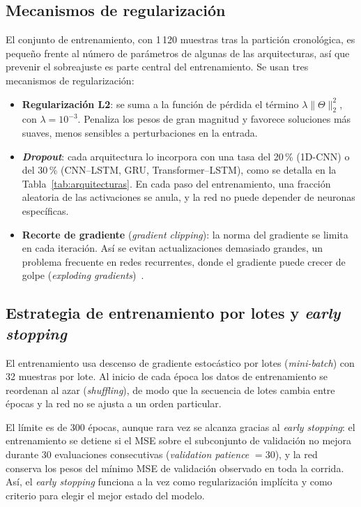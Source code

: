 \documentclass{report}
\begin{document}
\subsection{Mecanismos de regularización}
\label{subsec:regularizacion}

El conjunto de entrenamiento, con 1\,120 muestras tras la partición cronológica, es pequeño frente al número de parámetros de algunas de las arquitecturas, así que prevenir el sobreajuste es parte central del entrenamiento. Se usan tres mecanismos de regularización:

\begin{itemize}
    \item \textbf{Regularización L2}: se suma a la función de pérdida el término $\lambda \|\Theta\|_2^2$, con $\lambda = 10^{-3}$. Penaliza los pesos de gran magnitud y favorece soluciones más suaves, menos sensibles a perturbaciones en la entrada.

    \item \textbf{\textit{Dropout}}: cada arquitectura lo incorpora con una tasa del 20\,\% (1D-CNN) o del 30\,\% (CNN--LSTM, GRU, Transformer--LSTM), como se detalla en la Tabla~\ref{tab:arquitecturas}. En cada paso del entrenamiento, una fracción aleatoria de las activaciones se anula, y la red no puede depender de neuronas específicas.

    \item \textbf{Recorte de gradiente} (\textit{gradient clipping}): la norma del gradiente se limita en cada iteración. Así se evitan actualizaciones demasiado grandes, un problema frecuente en redes recurrentes, donde el gradiente puede crecer de golpe (\textit{exploding gradients})~\cite{exploding2020gradient}.
\end{itemize}

\subsection{Estrategia de entrenamiento por lotes y \textit{early stopping}}
\label{subsec:training_strategy}

El entrenamiento usa descenso de gradiente estocástico por lotes (\textit{mini-batch}) con 32 muestras por lote. Al inicio de cada época los datos de entrenamiento se reordenan al azar (\textit{shuffling}), de modo que la secuencia de lotes cambia entre épocas y la red no se ajusta a un orden particular.

El límite es de 300 épocas, aunque rara vez se alcanza gracias al \textit{early stopping}: el entrenamiento se detiene si el MSE sobre el subconjunto de validación no mejora durante 30 evaluaciones consecutivas (\textit{validation patience} $=30$), y la red conserva los pesos del mínimo MSE de validación observado en toda la corrida. Así, el \textit{early stopping} funciona a la vez como regularización implícita y como criterio para elegir el mejor estado del modelo.
\end{document}
